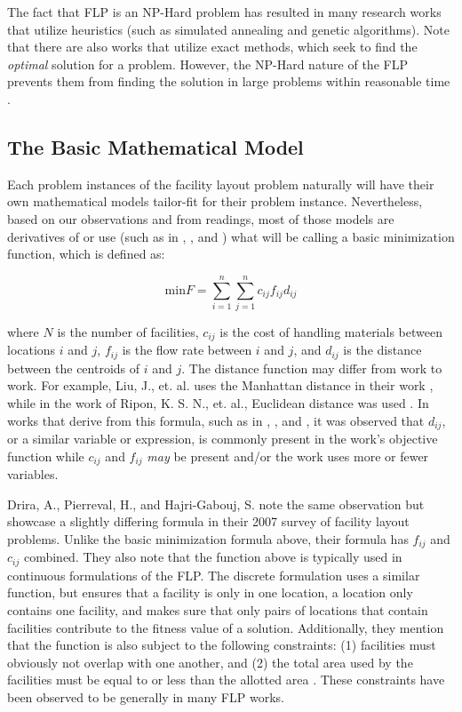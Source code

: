 The fact that FLP is an NP-Hard problem has resulted in many research works that utilize heuristics (such as simulated annealing and genetic algorithms). Note that there are also works that utilize exact methods, which seek to find the \textit{optimal} solution for a problem. However, the NP-Hard nature of the FLP prevents them from finding the solution in large problems within reasonable time \cite{Asl2015}.

\subsection{The Basic Mathematical Model}
Each problem instances of the facility layout problem naturally will have their own mathematical models tailor-fit for their problem instance. Nevertheless, based on our observations and from readings, most of those models are derivatives of or use (such as in \cite{Garcia-Hernandez2013}, \cite{Lin2019}, and \cite{Navarro2016}) what will be calling a basic minimization function, which is defined as:

$$
\text{min} F = \sum_{i=1}^{n}\sum_{j=1}^{n}c_{ij}f_{ij}d_{ij}
$$

where $N$ is the number of facilities, $c_{ij}$ is the cost of handling materials between locations $i$ and $j$, $f_{ij}$ is the flow rate between $i$ and $j$, and $d_{ij}$ is the distance between the centroids of $i$ and $j$. The distance function may differ from work to work. For example, Liu, J., et. al. uses the Manhattan distance in their work \cite{Liu2018}, while in the work of Ripon, K. S. N., et. al., Euclidean distance was used \cite{Ripon2013}. In works that derive from this formula, such as in \cite{Farmakis2018}, \cite{Solimanpur2008}, and \cite{Peng2018}, it was observed that $d_{ij}$, or a similar variable or expression, is commonly present in the work's objective function while $c_{ij}$ and $f_{ij}$ \textit{may} be present and/or the work uses more or fewer variables.

Drira, A., Pierreval, H., and Hajri-Gabouj, S. note the same observation but showcase a slightly differing formula in their 2007 survey of facility layout problems. Unlike the basic minimization formula above, their formula has $f_{ij}$ and $c_{ij}$ combined. They also note that the function above is typically used in continuous formulations of the FLP. The discrete formulation uses a similar function, but ensures that a facility is only in one location, a location only contains one facility, and makes sure that only pairs of locations that contain facilities contribute to the fitness value of a solution. Additionally, they mention that the function is also subject to the following constraints: (1) facilities must obviously not overlap with one another, and (2) the total area used by the facilities must be equal to or less than the allotted area \cite{Drira2007}. These constraints have been observed to be generally in many FLP works.

